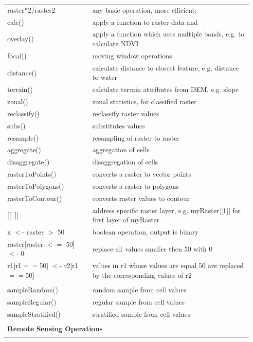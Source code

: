 \documentclass[10pt,landscape]{article}
\begin{document}
\begin{multicols}{3}
\begin{tabular}{@{}p{\the\MyLen}%
                @{}p{\linewidth-\the\MyLen}@{}}
raster*2/raster2 & any basic operation, more efficient: \\                
calc()  	& apply a function to raster data and\\
overlay()       & apply a function which uses multiple bands, e.g. to calculate NDVI \\
focal()         & moving window operations \\
distance()      & calculate distance to closest feature, e.g. distance to water\\
terrain() 	& calculate terrain attributes from DEM, e.g. slope \\
zonal()         & zonal statistics, for classified raster\\
reclassify()	& reclassify raster values \\
subs()		& substitutes values \\
resample() 	& resampling of raster to raster \\
aggregate()	& aggregation of cells \\
disaggregate()	& disaggregation of cells \\
rasterToPoints() & converts a raster to vector points	\\
rasterToPolygons() & converts a raster to polygons \\
rasterToContour()  & converts raster values to contour \\
$[[$\ $]]$		& address specific raster layer, e.g. myRaster[[1]] for first layer of myRaster    \\  
x $<$- raster $>$ 50	& boolean operation, output is binary \\
raster[raster $<=$ 50] $<$- 0 & replace all values smaller then 50 with 0 \\
r1[r1$==$50] $<$- r2[r1$==$50] & values in r1 whose values are equal 50 are replaced by the corresponding values of r2 \\
		&			 \\
  sampleRandom() & random sample from cell values\\
  sampleRegular() & regular sample from cell values\\
  sampleStratified() & stratified sample from cell values\\

     & \\
  
   
 \multicolumn{2}{l}{\textbf{Remote Sensing Operations}} \\

       & \\
  


\end{tabular}
\end{multicols}
\end{document}
